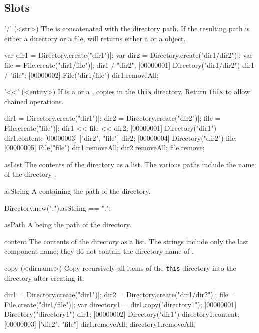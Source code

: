 \subsection{Slots}
\begin{urbiscriptapi}
\item['/'](<str>)
  The   is concatenated with the directory path.
  If the resulting path is either a directory or a file,  will
  returns either a  or a  object.
\begin{urbiscript}
var dir1 = Directory.create("dir1")|;
var dir2 = Directory.create("dir1/dir2")|;
var file = File.create("dir1/file")|;
dir1 / "dir2";
[00000001] Directory("dir1/dir2")
dir1 / "file";
[00000002] File("dir1/file")
dir1.removeAll;
\end{urbiscript}

\item['<<'](<entity>)
  If  is a  or a ,
   copies  in the \lstinline|this| directory.
  Return \lstinline|this| to allow chained operations.
\begin{urbiscript}
dir1 = Directory.create("dir1")|;
dir2 = Directory.create("dir2")|;
file = File.create("file")|;
dir1 << file << dir2;
[00000001] Directory("dir1")
dir1.content;
[00000003] ["dir2", "file"]
dir2;
[00000004] Directory("dir2")
file;
[00000005] File("file")
dir1.removeAll;
dir2.removeAll;
file.remove;
\end{urbiscript}

\item[asList]
  The contents of the directory as a  list.  The
  various paths include the name of the directory \this.

\item[asString] A  containing the path of the directory.
\begin{urbiassert}
Directory.new(".").asString == ".";
\end{urbiassert}

\item[asPath] A  being the path of the directory.

\item[content]
  The contents of the directory as a  list.  The
  strings include only the last component name; they do not contain
  the directory name of \this.

\item[copy](<dirname>)
  Copy recursively all items of the \lstinline|this| directory
  into the directory  after creating it.
\begin{urbiscript}
dir1 = Directory.create("dir1")|;
dir2 = Directory.create("dir1/dir2")|;
file = File.create("dir1/file")|;
var directory1 = dir1.copy("directory1");
[00000001] Directory("directory1")
dir1;
[00000002] Directory("dir1")
directory1.content;
[00000003] ["dir2", "file"]
dir1.removeAll;
directory1.removeAll;
\end{urbiscript}


\end{urbiscriptapi}
